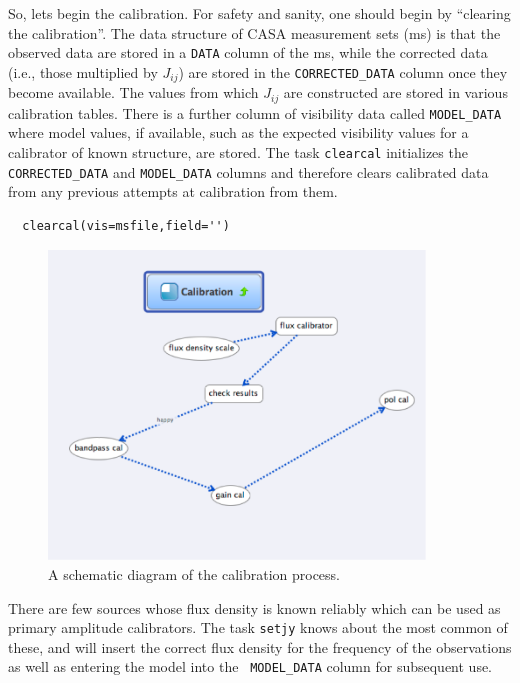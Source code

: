 \documentclass[force,almostfull,justified]{tufte-book}
\begin{document}
So, lets begin the calibration. For safety and sanity, one should begin by ``clearing the
calibration''.  The data structure of CASA measurement sets (ms) is that the observed data are stored
in a {\tt DATA} column of the ms, while the corrected data (i.e., those multiplied by $J_{ij}$) are
stored in the {\tt CORRECTED\_DATA} column once they become available.  The values from which $J_{ij}$
are constructed are stored in various calibration tables.  There is a further column of visibility
data called {\tt MODEL\_DATA} where model values, if available, such as the expected visibility values
for a calibrator of known structure, are stored.  The task {\tt clearcal} initializes the {\tt
CORRECTED\_DATA} and {\tt MODEL\_DATA} columns and therefore clears calibrated data from any previous
attempts at calibration from them.

\begin{casacmd}
\begin{verbatim}
  clearcal(vis=msfile,field='')
\end{verbatim}
\end{casacmd}

\begin{figure}
  \includegraphics[width=10.0cm]{images/casa_cal}
  \caption[Mind map.]{A schematic diagram of the calibration process.}
  \label{fig:textfig}
\end{figure}

\bigskip
{}

\bigskip

There are few sources whose flux density is known reliably which can be used as primary amplitude
calibrators.  The task {\tt setjy} knows about the most common of these, and will insert the correct
flux density for the frequency of the observations as well as entering the model into the {\tt
MODEL\_DATA} column for subsequent use.
\end{document}
